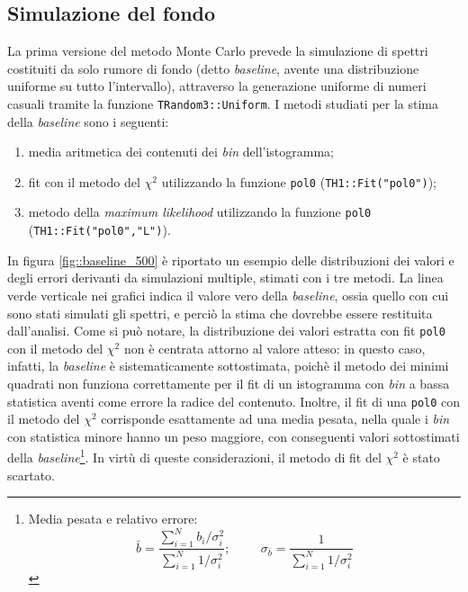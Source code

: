 \documentclass[10pt, oneside, a4paper]{article}   	%
\begin{document}
\subsection{Simulazione del fondo}
La prima versione del metodo Monte Carlo prevede la simulazione di spettri costituiti da solo rumore di fondo (detto \textit{baseline}, avente una distribuzione uniforme su tutto l'intervallo), attraverso la generazione uniforme di numeri casuali tramite la funzione \lstinline{TRandom3::Uniform}. I metodi studiati per la stima della \textit{baseline} sono i seguenti:
\begin{enumerate}
 \item media aritmetica dei contenuti dei \emph{bin} dell'istogramma;
 \item fit con il metodo del $\chi^2$ utilizzando la funzione \lstinline{pol0} (\lstinline{TH1::Fit("pol0")});
 \item metodo della \textit{maximum likelihood} utilizzando la funzione \lstinline{pol0} \newline (\lstinline{TH1::Fit("pol0","L")}).
\end{enumerate}

In figura \ref{fig::baseline_500} è riportato un esempio delle distribuzioni dei valori e degli errori derivanti da simulazioni multiple, stimati con i tre metodi. La linea verde verticale nei grafici indica il valore vero della \textit{baseline}, ossia quello con cui sono stati simulati gli spettri, e perciò la stima che dovrebbe essere restituita dall'analisi. Come si può notare, la distribuzione dei valori estratta con fit \lstinline{pol0} con il metodo del $\chi^2$ non è centrata attorno al valore atteso: in questo caso, infatti, la \textit{baseline} è sistematicamente sottostimata, poichè il metodo dei minimi quadrati non funziona correttamente per il fit di un istogramma con \emph{bin} a bassa statistica aventi come errore la radice del contenuto. Inoltre, il fit di una \lstinline{pol0} con il metodo del $\chi^2$ corrisponde esattamente ad una media pesata, nella quale i \emph{bin} con statistica minore hanno un peso maggiore, con conseguenti valori sottostimati della \textit{baseline}\footnote{Media pesata e relativo errore:
$$\bar{b}=\frac{\sum_{i=1}^N b_i/\sigma_i^2}{\sum_{i=1}^N 1/\sigma_i^2};
\hspace{1cm} \sigma_{\bar{b}}=\frac{1}{\sum_{i=1}^N1/\sigma_i^2}$$}. In virtù di queste considerazioni, il metodo di fit del $\chi^2$ è stato scartato. 
\end{document}
